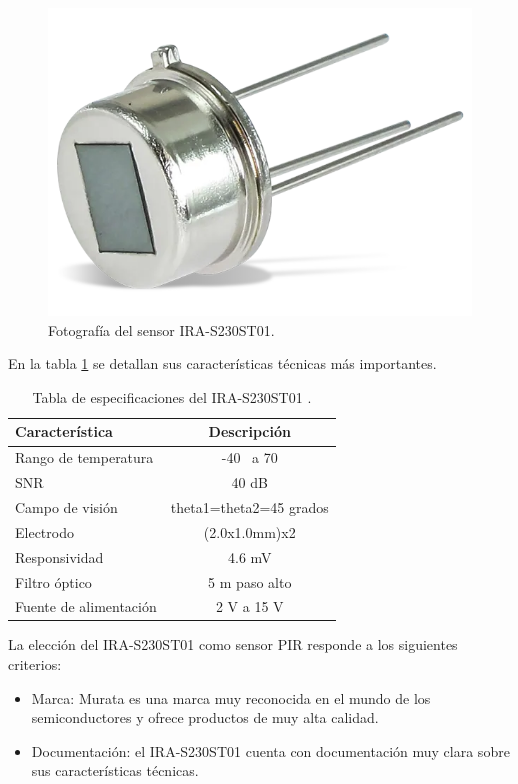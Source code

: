 \begin{figure}[h]
	\centering
	\includegraphics[scale=0.2]{./Figures/pir_photo.png}
	\caption{Fotografía del sensor IRA-S230ST01\protect\footnotemark.}
	\label{fig:pir_photo}
\end{figure}

En la tabla \ref{tab:pir_specs} se detallan sus características técnicas más importantes.

\begin{table}[h]
	\centering
	\caption[IRA-S230ST01 especificaciones]{Tabla de especificaciones del IRA-S230ST01 \cite{pir_info}.}
	\begin{tabular}{lc}   
		\toprule
		\textbf{Característica} 	 & \textbf{Descripción}  \\
		\midrule
		Rango de temperatura & -40 \textcelsius\ a 70 \textcelsius\\
		SNR & 40 dB \\
		Campo de visión & theta1=theta2=45 grados \\
		Electrodo & (2.0x1.0mm)x2 \\
		Responsividad & 4.6 mV \\
		Filtro óptico & 5 \textmu m paso alto \\
		Fuente de alimentación & 2 V a 15 V \\
		\bottomrule
		\hline
	\end{tabular}
	\label{tab:pir_specs}
\end{table}

La elección del IRA-S230ST01 como sensor PIR responde a los siguientes criterios: \\
\begin{itemize}
	\item Marca: Murata es una marca muy reconocida en el mundo de los semiconductores y ofrece productos de muy alta calidad.
	\item Documentación: el IRA-S230ST01 cuenta con documentación muy clara sobre sus características técnicas.
\end{itemize}

